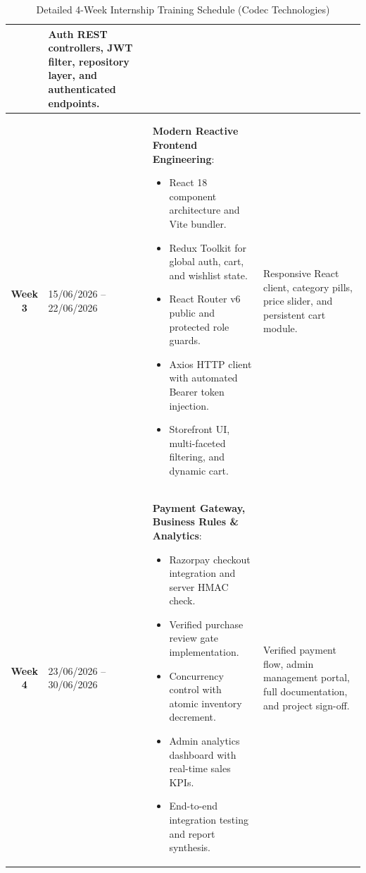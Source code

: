 \begin{table}[H]
\begin{tabularx}{\textwidth}{|c|p{3.2cm}|X|p{2.8cm}|}
\begin{itemize}[leftmargin=1.2em, topsep=2pt, parsep=0pt]
\end{itemize} & 
Auth REST controllers, JWT filter, repository layer, and authenticated endpoints. \\
\hline
\textbf{Week 3} & 
15/06/2026 -- 22/06/2026 & 
\textbf{Modern Reactive Frontend Engineering}:
\begin{itemize}[leftmargin=1.2em, topsep=2pt, parsep=0pt]
    \item React 18 component architecture and Vite bundler.
    \item Redux Toolkit for global auth, cart, and wishlist state.
    \item React Router v6 public and protected role guards.
    \item Axios HTTP client with automated Bearer token injection.
    \item Storefront UI, multi-faceted filtering, and dynamic cart.
\end{itemize} & 
Responsive React client, category pills, price slider, and persistent cart module. \\
\hline
\textbf{Week 4} & 
23/06/2026 -- 30/06/2026 & 
\textbf{Payment Gateway, Business Rules \& Analytics}:
\begin{itemize}[leftmargin=1.2em, topsep=2pt, parsep=0pt]
    \item Razorpay checkout integration and server HMAC check.
    \item Verified purchase review gate implementation.
    \item Concurrency control with atomic inventory decrement.
    \item Admin analytics dashboard with real-time sales KPIs.
    \item End-to-end integration testing and report synthesis.
\end{itemize} & 
Verified payment flow, admin management portal, full documentation, and project sign-off. \\
\hline
\end{tabularx}
\caption{Detailed 4-Week Internship Training Schedule (Codec Technologies)}
\label{tab:training_schedule}
\end{table}
